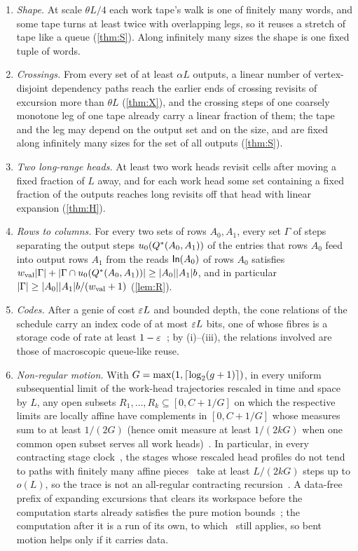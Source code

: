 \begin{enumerate}[leftmargin=2em,label=(\roman*)]
\item \emph{Shape.} At scale $\theta L/4$ each work tape's walk is one of finitely many words, and some tape turns at least
twice with overlapping legs, so it reuses a stretch of tape like a queue (\cref{thm:S}). Along infinitely many sizes the shape
is one fixed tuple of words.
\item \emph{Crossings.} From every set of at least $\alpha L$ outputs, a linear number of vertex-disjoint dependency paths reach
the earlier ends of crossing revisits of excursion more than $\theta L$ (\cref{thm:X}), and the crossing steps of one coarsely monotone leg
of one tape already carry a linear fraction of them; the tape and the leg may depend on the output set and on the size, and are fixed along
infinitely many sizes for the set of all outputs (\cref{thm:S}).
\item \emph{Two long-range heads.} At least two work heads revisit cells after moving a fixed fraction of $L$ away, and for each work head
some set containing a fixed fraction of the outputs reaches long revisits off that head with linear expansion (\cref{thm:H}).
\item \emph{Rows to columns.} For every two sets of rows $A_0,A_1$, every set $\Gamma$ of steps separating the output steps
$u_0(Q^{*}(A_0,A_1))$ of the entries that rows $A_0$ feed into output rows $A_1$ from the reads $\mathsf{In}(A_0)$ of rows $A_0$ satisfies
$w_{\mathrm{val}}\lvert \Gamma \rvert+\lvert \Gamma\cap u_0(Q^{*}(A_0,A_1)) \rvert\ge\lvert A_0 \rvert\lvert A_1 \rvert b$, and in particular
$\lvert \Gamma \rvert\ge\lvert A_0 \rvert\lvert A_1 \rvert b/(w_{\mathrm{val}}+1)$ (\cref{lem:R}).
\item \emph{Codes.} After a genie of cost $\varepsilon L$ and bounded depth, the cone relations of the schedule carry an index code of at most
$\varepsilon L$ bits, one of whose fibres is a storage code of rate at least $1-\varepsilon$~\cite[Corollary~O]{BoundedStack2026}; by (i)--(iii), the
relations involved are those of macroscopic queue-like reuse.
\item \emph{Non-regular motion.} With $G=\max(1,\lceil \log_2 (g+1) \rceil)$, in every uniform subsequential limit of the work-head trajectories rescaled
in time and space by $L$, any open subsets $R_1,\dots,R_k\subseteq[0,C+1/G]$ on which the respective limits are locally affine have
complements in $[0,C+1/G]$ whose measures sum to at least $1/(2G)$ (hence omit measure at least $1/(2kG)$ when one common open subset
serves all work heads)~\cite[Theorem~6.3, Lean-verified]{SecondPaper2026}. In particular, in every contracting stage
clock~\cite[Definition~7.2]{SecondPaper2026}, the stages whose rescaled head profiles do not tend to paths with finitely many affine
pieces~\cite[Definition~7.4]{SecondPaper2026} take at least $L/(2kG)$ steps up to $o(L)$, so the trace is not an all-regular contracting
recursion~\cite[Theorem~7.5, Lean-verified]{SecondPaper2026}. A data-free prefix of expanding excursions that clears its workspace before
the computation starts already satisfies the pure motion bounds~\cite[Theorem~8.1, Lean-verified]{SecondPaper2026}; the computation after
it is a run of its own, to which~\cite[Theorem~7.5]{SecondPaper2026} still applies, so bent motion helps only if it carries data.
\end{enumerate}
